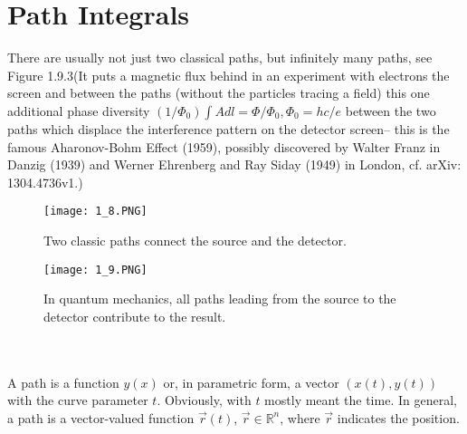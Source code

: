 \section{Path Integrals} 
There are usually not just two classical paths, but infinitely many paths,
see Figure 1.9.3(It puts a magnetic flux behind in an experiment with electrons the screen and between the paths (without the particles tracing a field)
this one additional phase diversity $(1/\Phi_0)\int Adl = \Phi/\Phi_0, \Phi_0=hc/e$ between the two paths which displace the interference pattern on the detector screen-- this is the famous Aharonov-Bohm Effect (1959), possibly discovered by Walter
Franz in Danzig (1939) and Werner Ehrenberg and Ray Siday (1949) in London, cf.
arXiv: 1304.4736v1.)
\begin{figure}[ht]
    \centering
    \texttt{[image: 1\_8.PNG]}
    \caption{Two classic paths connect the source and
    the detector.}
    \label{fig:1.8}
\end{figure}
\begin{figure}[ht]
    \centering
    \texttt{[image: 1\_9.PNG]}
    \caption{In quantum mechanics, all paths leading from the source to the detector contribute to the result.}
    \label{fig:1.9}
\end{figure}
\\ \\
A path is a function $y (x)$ or, in parametric form, a vector $(x (t), y (t))$ with the curve parameter $t$. Obviously, with $t$ mostly
meant the time. In general, a path is a vector-valued function $\vec{r} (t)$,
$\vec{r} \in \mathbb{R}^n$, where $\vec{r}$ indicates the position.

